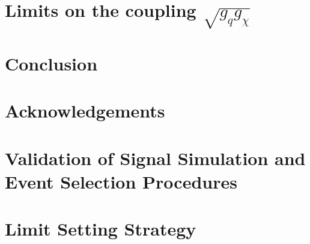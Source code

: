 \documentclass[a4paper,11pt]{article}
\renewcommand{\=}[1]{\stackrel{#1}{=}} %
\begin{document}
\section{Limits on the coupling $\sqrt{g_{q}g_{\chi}}$} 
\label{sec:sec4}

\section{Conclusion} 
\label{sec:sec5}


\section{Acknowledgements} 
\label{sec:sec6}

\appendix
\section{Validation of Signal Simulation and Event Selection Procedures}
\label{AppendixA}


\section{Limit Setting Strategy}
\label{AppendixB}


\begin{thebibliography}{99}

\end{thebibliography}
\end{document}
